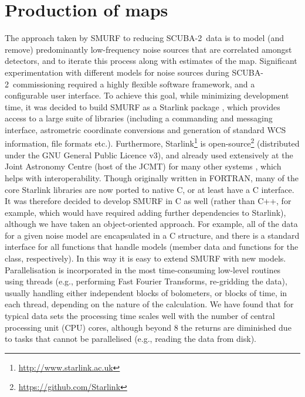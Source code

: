 \documentclass[useAMS,usenatbib,nofootinbib]{mn2e}
\newcommand{\scuba}{SCUBA-2}
\begin{document}
\section{Production of maps}
\label{sec:algorithm}

The approach taken by SMURF to reducing \scuba\ data is to model (and
remove) predominantly low-frequency noise sources that are correlated
amongst detectors, and to iterate this process along with estimates of
the map. Significant experimentation with different models for noise
sources during \scuba\ commissioning required a highly flexible
software framework, and a configurable user interface. To achieve this
goal, while minimizing development time, it was decided to build SMURF
as a Starlink package \citep{2009ASPC..411..418J}, which provides
access to a large suite of libraries (including a commanding and
messaging interface, astrometric coordinate conversions and generation
of standard WCS information, file formats etc.). Furthermore,
Starlink\footnote{\url{http://www.starlink.ac.uk}} is
open-source\footnote{\url{https://github.com/Starlink}} (distributed under the GNU General Public Licence v3), and already
used extensively at the Joint Astronomy Centre (host of the JCMT) for
many other systems \citep{jenness2011}, which helps with
interoperability. Though originally written in FORTRAN, many of the
core Starlink libraries are now ported to native C, or at least have a
C interface. It was therefore decided to develop SMURF in C as well
(rather than C++, for example, which would have required adding
further dependencies to Starlink), although we have taken an
object-oriented approach. For example, all of the data for a given
noise model are encapsulated in a C structure, and there is a standard
interface for all functions that handle models (member data and
functions for the class, respectively). In this way it is easy to
extend SMURF with new models. Parallelisation is incorporated in the
most time-consuming low-level routines using threads (e.g., performing
Fast Fourier Transforms, re-gridding the data), usually handling
either independent blocks of bolometers, or blocks of time, in each
thread, depending on the nature of the calculation. We have found that
for typical data sets the processing time scales well with the number
of central processing unit (CPU) cores, although beyond 8 the returns
are diminished due to tasks that cannot be parallelised (e.g., reading
the data from disk).
\end{document}
